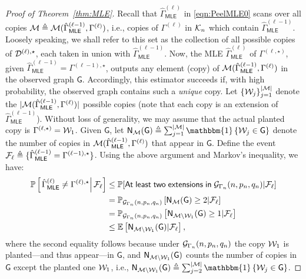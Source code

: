 \documentclass[12pt]{article}
\newcommand{\bE}{\mathbb{E}}
\newcommand{\Ind}{\mathbbm{1}}
\newcommand {\pr} {\mathbb{P}}
\newcommand{\calD}{{\cal D}}
\newcommand{\calF}{{\cal F}}
\newcommand{\calG}{{\cal G}}
\newcommand{\calK}{{\cal K}}
\newcommand{\calM}{{\cal M}}
\newcommand{\calW}{{\cal W}}
\newcommand{\pp}[1]{\left[#1\right]}
\newcommand{\ppp}[1]{\left\{#1\right\}}
\newcommand{\s}[1]{\mathsf{#1}}
\begin{document}
\begin{proof}[Proof of Theorem~\ref{thm:MLE}]
Recall that $\hat{\Gamma}^{(\ell)}_{\s{MLE}}$ in \eqref{eqn:PeelMLE0} scans over all copies $\calM\triangleq\calM(\hat{\Gamma}^{(\ell-1)}_{\s{MLE}},\Gamma^{(\ell)})$, i.e., copies of $\Gamma^{(\ell)}$ in $\calK_n$ which contain $\hat{\Gamma}^{(\ell-1)}_{\s{MLE}}$. Loosely speaking, we shall refer to this set as the collection of all possible copies of $\calD^{(\ell),\star}$, each taken in union with $\hat{\Gamma}^{(\ell-1)}_{\s{MLE}}$. Now, the MLE $\hat{\Gamma}^{(\ell)}_{\s{MLE}}$ of $\Gamma^{(\ell,\star)}$, given $\hat{\Gamma}^{(\ell-1)}_{\s{MLE}}={\Gamma}^{(\ell-1),\star}$, outputs any element (copy) of $\calM(\hat{\Gamma}^{(\ell-1)}_{\s{MLE}},\Gamma^{(\ell)})$ in the observed graph $\s{G}$. Accordingly, this estimator succeeds if, with high probability, the observed graph contains such a \emph{unique} copy. Let $\{\calW_j\}_{j=1}^{|\calM|}$ denote the $|\calM(\hat{\Gamma}^{(\ell-1)}_{\s{MLE}},\Gamma^{(\ell)})|$ possible copies (note that each copy is an extension of $\hat{\Gamma}^{(\ell-1)}_{\s{MLE}}$). Without loss of generality, we may assume that the actual planted copy is $\Gamma^{(\ell,\star)} = \calW_1$. Given $\s{G}$, let $\s{N}_{\calM}(\s{G}) \triangleq \sum_{j=1}^{|\calM|}\Ind\ppp{\calW_j\in\s{G}}$ denote the number of copies in $\calM(\hat{\Gamma}^{(\ell-1)}_{\s{MLE}},\Gamma^{(\ell)})$ that appear in $\s{G}$. Define the event $\calF_\ell\triangleq\{\hat{\Gamma}^{(\ell-1)}_{\s{MLE}}=\Gamma^{(\ell-1),\star}\}$. Using the above argument and Markov's inequality, we have:
\begin{align}
\pr\pp{\left.\hat{\Gamma}^{(\ell)}_{\s{MLE}}\neq{\Gamma}^{(\ell),\star}\right|\calF_\ell}&\leq\pr[\s{At}\;\s{least}\;\s{two}\;\s{extensions}\;\s{in}\;\calG_{\Gamma_n}(n,p_n,q_n)\vert\calF_\ell]\\
& = \pr_{\calG_{\Gamma_n}(n,p_n,q_n)}\pp{\s{N}_{\calM}(\s{G})\geq2\vert\calF_\ell}\\
& = \pr_{\calG_{\Gamma_n}(n,p_n,q_n)}\pp{\s{N}_{\calM\setminus\calW_1}(\s{G})\geq1\vert\calF_\ell}\\
    &\leq \bE\pp{\s{N}_{\calM\setminus\calW_1}(\s{G})\vert\calF_\ell},\label{eqn:FirstMoment}
\end{align}
where the second equality follows because under $\calG_{\Gamma_n}(n,p_n,q_n)$ the copy $\calW_1$ is planted—and thus appear—in $\s{G}$, and $\s{N}_{\calM\setminus\calW_1}(\s{G})$ counts the number of copies in $\s{G}$ except the planted one $\calW_1$, i.e., $\s{N}_{\calM\setminus\calW_1}(\s{G})\triangleq\sum_{j=2}^{|\calM|}\Ind\ppp{\calW_j\in\s{G}}$. 


\end{proof}
\end{document}
